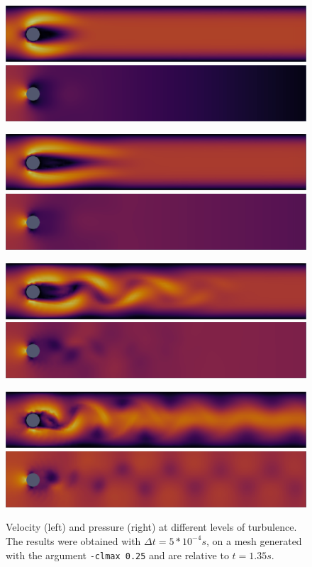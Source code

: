 \begin{figure}[h]
  \begin{minipage}{\linewidth}
  \includegraphics[width=.48\linewidth]{image/velocity-20-2d.png}\hfill
  \includegraphics[width=.48\linewidth]{image/pressure-20-2d.png}\hfill
  \end{minipage}%
  \par
  \begin{minipage}{\linewidth}
  \includegraphics[width=.48\linewidth]{image/velocity-48-2d.png}\hfill
  \includegraphics[width=.48\linewidth]{image/pressure-48-2d.png}\hfill
  \end{minipage}%
  \par
  \begin{minipage}{\linewidth}
  \includegraphics[width=.48\linewidth]{image/velocity-100-2d.png}\hfill
  \includegraphics[width=.48\linewidth]{image/pressure-100-2d.png}\hfill
  \end{minipage}%
  \par
  \begin{minipage}{\linewidth}
  \includegraphics[width=.48\linewidth]{image/velocity-200-2d.png}\hfill
  \includegraphics[width=.48\linewidth]{image/pressure-200-2d.png}\hfill
  \end{minipage}%
  
  \caption{Velocity (left) and pressure (right) at different levels of turbulence. The results were obtained with $\Delta t = 5 * 10^{-4}s$, on a mesh generated with the argument \texttt{-clmax 0.25} and are relative to $t = 1.35s$.}
  \label{fig:velocity-pressure-2d}
\end{figure}

